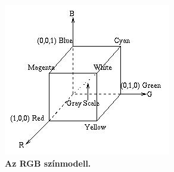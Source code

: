 \documentclass[12pt]{article}
\theoremstyle{plain}
\begin{document}
\begin{figure}[H]
    \begin{center}
    \includegraphics[width=0.55\linewidth]{media/rgb.jpg}
    \caption{\textbf{Az RGB színmodell.}} 
    \label{fig:rgb}
    \end{center}
\end{figure}



\end{document}
